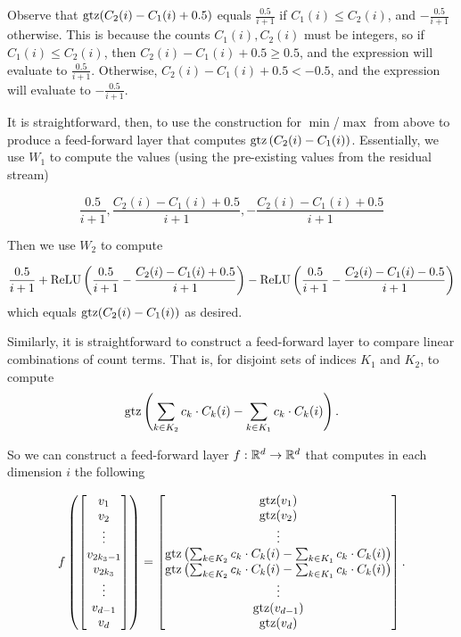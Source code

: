     Observe that $\operatorname{gtz}(C_2(i)-C_1(i)+0.5)$ equals $\frac{0.5}{i+1}$ if $C_1(i)\leq C_2(i)$, and $-\frac{0.5}{i+1}$ otherwise.
    This is because the counts $C_1(i),C_2(i)$ must be integers, so if $C_1(i)\leq C_2(i)$, then $C_2(i)-C_1(i)+0.5\geq 0.5$, and the expression will evaluate to $\frac{0.5}{i+1}$. Otherwise, $C_2(i)-C_1(i)+0.5<-0.5$, and the expression will evaluate to $-\frac{0.5}{i+1}$.

    It is straightforward, then, to use the construction for $\min$/$\max$ from above to produce a feed-forward layer that computes $\operatorname{gtz}\left(C_2(i)-C_1(i)\right)$. Essentially, we use $W_1$ to compute the values (using the pre-existing values from the residual stream)

    \[\frac{0.5}{i+1}, \frac{C_2(i)-C_1(i)+0.5}{i+1}, -\frac{C_2(i)-C_1(i)+0.5}{i+1}\]

    Then we use $W_2$ to compute

    \[\frac{0.5}{i+1}+\text{ReLU}\left(\frac{0.5}{i+1}-\frac{C_2(i)-C_1(i)+0.5}{i+1}\right)-\text{ReLU}\left(\frac{0.5}{i+1}-\frac{C_2(i)-C_1(i)-0.5}{i+1}\right)\]
    which equals $\operatorname{gtz}(C_2(i)-C_1(i))$ as desired.

    Similarly, it is straightforward to construct a feed-forward layer to compare linear combinations of count terms. That is, for disjoint sets of indices $K_1$ and $K_2$, to compute
    \[\operatorname{gtz}\left(\sum_{k\in K_2} c_{k} \cdot C_k(i) -\sum_{k\in K_1} c_{k} \cdot C_k(i)\right).\]

    So we can construct a feed-forward layer $f:\mathbb{R}^d\to\mathbb{R}^d$ that computes in each dimension $i$ the following

    \[f\left(\begin{bmatrix}
        v_1\\
        v_2\\
        \vdots\\
        v_{2k_3-1}\\
        v_{2k_3}\\
        \vdots\\
        v_{d-1}\\
        v_{d}\\
    \end{bmatrix}\right) =\begin{bmatrix}
        \operatorname{gtz}(v_1)\\
        \operatorname{gtz}(v_2)\\
        \vdots\\
        \operatorname{gtz}\left(\sum_{k\in K_2} c_{k} \cdot C_k(i) -\sum_{k\in K_1} c_{k} \cdot C_k(i)\right)\\
        \operatorname{gtz}\left(\sum_{k\in K_2} c_{k} \cdot C_k(i) -\sum_{k\in K_1} c_{k} \cdot C_k(i)\right)\\
        \vdots\\
        \operatorname{gtz}(v_{d-1})\\
        \operatorname{gtz}(v_{d})\\
    \end{bmatrix}. \]

